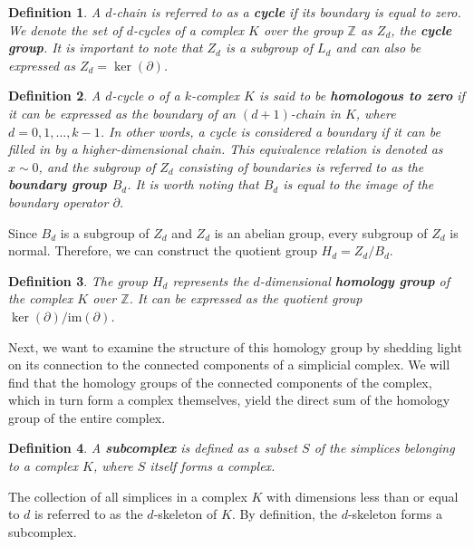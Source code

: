 \documentclass{article}
\newtheorem{definition}{Definition}[section]
\begin{document}
\begin{definition}
A $d$-chain is referred to as a \textbf{cycle} if its boundary is equal to zero. We denote the set of $d$-cycles of a complex $K$ over the group $\mathbb{Z}$ as $Z_d$, the \textbf{cycle group}. It is important to note that $Z_d$ is a subgroup of $L_d$ and can also be expressed as $Z_d = \ker(\partial)$.
\end{definition}

\begin{definition}
A $d$-cycle $o$ of a $k$-complex $K$ is said to be \textbf{homologous to zero} if it can be expressed as the boundary of an $(d+1)$-chain in $K$, where $d=0,1,\ldots,k-1$. In other words, a cycle is considered a boundary if it can be \glqq filled in\grqq{} by a higher-dimensional chain. This equivalence relation is denoted as $x \sim 0$, and the subgroup of $Z_d$ consisting of boundaries is referred to as the \textbf{boundary group $B_d$}. It is worth noting that $B_d$ is equal to the image of the boundary operator $\partial$.
\end{definition}

Since $B_d$ is a subgroup of $Z_d$ and $Z_d$ is an abelian group, every subgroup of $Z_d$ is normal. Therefore, we can construct the quotient group $H_d = Z_d / B_d$.

\begin{definition}
The group $H_d$ represents the $d$-dimensional \textbf{homology group} of the complex $K$ over $\mathbb{Z}$. It can be expressed as the quotient group $\ker(\partial) / \text{im}(\partial)$.
\end{definition}

Next, we want to examine the structure of this homology group by shedding light on its connection to the connected components of a simplicial complex. We will find that the homology groups of the connected components of the complex, which in turn form a complex themselves, yield the direct sum of the homology group of the entire complex.

\begin{definition}
A \textbf{subcomplex} is defined as a subset $S$ of the simplices belonging to a complex $K$, where $S$ itself forms a complex.
\end{definition}

The collection of all simplices in a complex $K$ with dimensions less than or equal to $d$ is referred to as the $d$-skeleton of $K$. By definition, the $d$-skeleton forms a subcomplex.
\end{document}

